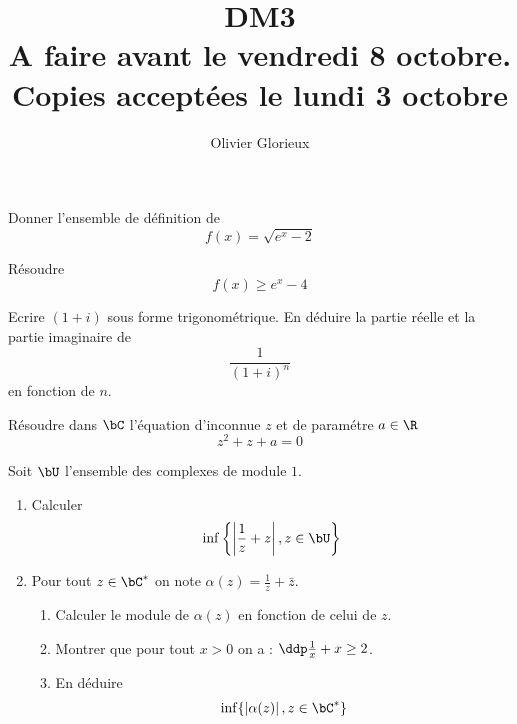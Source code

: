 \documentclass[a4paper, 11pt,reqno]{article}
\author{Olivier Glorieux}
\begin{document}
\title{DM3 \\
\small{A faire avant le vendredi 8 octobre.\\ 
Copies acceptées le lundi 3 octobre}}
\begin{exercice}
Donner l'ensemble de définition de 
$$f(x) = \sqrt{e^x-2}$$

Résoudre $$f(x)\geq e^{x}-4$$
\end{exercice}

\begin{exercice}
Ecrire $(1+i)$ sous forme trigonométrique.
En déduire la partie réelle et la partie imaginaire de 
$$\frac{1}{(1+i)^n}$$
 en fonction de $n$.
\end{exercice}


\begin{exercice}
Résoudre dans $\bC$ l'équation d'inconnue $z$ et de paramétre $a\in \R$  
$$z^2+z+a=0$$

\end{exercice}





\begin{exercice}
Soit $\bU$ l'ensemble des complexes de module $1$. 
\begin{enumerate}
\item Calculer 
$$\inf \left\{ \left| \frac{1}{z}+z\right| , z \in \bU\right\}$$

\item Pour tout $z\in \bC^*$ on note  $\alpha(z)= \frac{1}{{z}}+\bar{z}$. 
\begin{enumerate}
\item Calculer le module de $\alpha(z)$ en fonction de celui de $z$. 
\item Montrer que pour tout $x>0$ on a : $\ddp \frac{1}{x}+x\geq 2$.
\item En déduire 
$$\inf\{ \left| \alpha(z)\right| , z \in \bC^*\}$$
\end{enumerate}
\end{enumerate}

\end{exercice}
\end{document}
